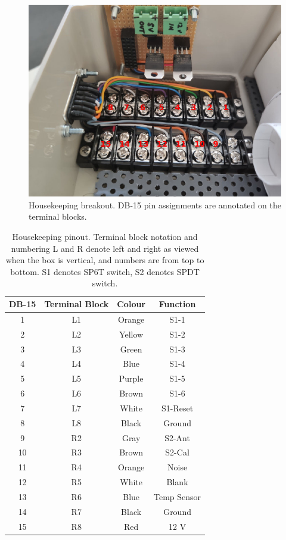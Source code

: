 \begin{figure}
	\centering
	\includegraphics[width=0.7\linewidth]{Figures/Terminal}
	\caption{Housekeeping breakout. DB-15 pin assignments are annotated on the terminal blocks.}
	\label{Fig:Terminal}
\end{figure}

\begin{table}
	\centering
	\begin{tabular}{ c|c|c|c} 
		\hline
		DB-15 & Terminal Block & Colour & Function \\
		\hline
		\hline
		1 & L1 & Orange & S1-1 \\ 
		2 & L2 & Yellow & S1-2 \\ 
		3 & L3 & Green & S1-3 \\
		4 & L4 & Blue & S1-4 \\
		5 & L5 & Purple & S1-5 \\
		6 & L6 & Brown & S1-6 \\
		7 & L7 & White & S1-Reset \\
		8 & L8 & Black & Ground \\
		9 & R2 & Gray & S2-Ant \\
		10 & R3 & Brown & S2-Cal \\
		11 & R4 & Orange & Noise \\
		12 & R5 & White & Blank \\
		13 & R6 & Blue & Temp Sensor \\
		14 & R7 & Black & Ground \\
		15 & R8 & Red & 12 V \\
		\hline
	\end{tabular}
	\caption{Housekeeping pinout. Terminal block notation and numbering L and R denote left and right as viewed when the box is vertical, and numbers are from top to bottom. S1 denotes SP6T switch, S2 denotes SPDT switch.}
	\label{Tab:Pinout}
\end{table}



